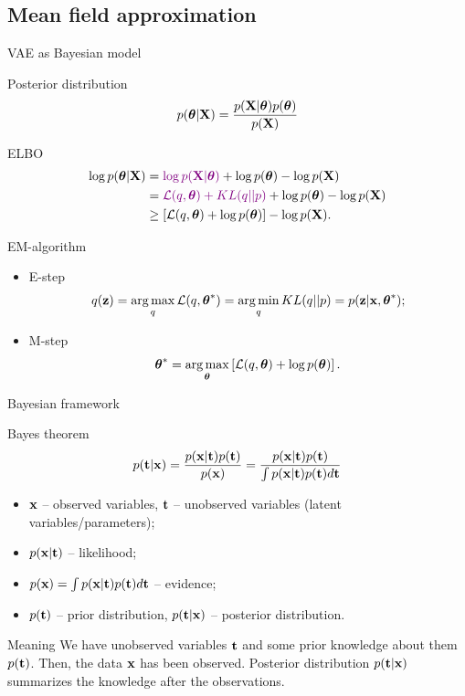 \subsection{Mean field approximation}
\begin{frame}{VAE as Bayesian model}
	\begin{block}{Posterior distribution}
		\vspace{-0.2cm}
		\[
		p(\boldsymbol{\theta} | \mathbf{X}) = \frac{p(\mathbf{X} | \boldsymbol{\theta}) p(\boldsymbol{\theta})}{p(\mathbf{X})}
		\]
		\vspace{-0.5cm}
	\end{block}
	\begin{block}{ELBO}
		\vspace{-0.5cm}
		\begin{align*}
			\log p(\boldsymbol{\theta} | \mathbf{X}) &= {\color{violet}\log p(\mathbf{X} | \boldsymbol{\theta})} + \log p(\boldsymbol{\theta}) - \log p(\mathbf{X}) \\
			&= {\color{violet}\mathcal{L}(q, \boldsymbol{\theta}) + KL(q || p)} + \log p(\boldsymbol{\theta}) - \log p(\mathbf{X}) \\
			&\geq \left[ \mathcal{L}(q, \boldsymbol{\theta}) + \log p(\boldsymbol{\theta}) \right] - \log p(\mathbf{X}) .
		\end{align*}
		\vspace{-0.7cm}
	\end{block}
	\begin{block}{EM-algorithm}
		\begin{itemize}
			\item E-step
			\vspace{-0.2cm}
			\[
			q(\mathbf{z}) = \operatorname*{arg\,max}_q \mathcal{L} (q, \boldsymbol{\theta}^*) = \operatorname*{arg\,min}_q KL(q || p) =
			p(\mathbf{z}| \mathbf{x}, \boldsymbol{\theta}^*);
			\]
			\vspace{-0.5cm}
			\item M-step
			\[
			\boldsymbol{\theta}^* = \operatorname*{arg\,max}_{\boldsymbol{\theta}} \left[ \mathcal{L} (q, \boldsymbol{\theta}) + \log p(\boldsymbol{\theta}) \right].
			\]
		\end{itemize}
	\end{block}
\end{frame}
\begin{frame}{Bayesian framework}
	\begin{block}{Bayes theorem}
		\[
			p(\mathbf{t} | \mathbf{x}) = \frac{p(\mathbf{x} | \mathbf{t}) p(\mathbf{t})}{p(\mathbf{x})} = \frac{p(\mathbf{x} | \mathbf{t}) p(\mathbf{t})}{\int p(\mathbf{x} | \mathbf{t}) p(\mathbf{t}) d \mathbf{t}} 
		\]
		\begin{itemize}
			\item $\mathbf{x}$ -- observed variables, $\mathbf{t}$ -- unobserved variables (latent variables/parameters);
			\item $p(\mathbf{x} | \mathbf{t})$ -- likelihood;
			\item $p(\mathbf{x}) = \int p(\mathbf{x} | \mathbf{t}) p(\mathbf{t}) d \mathbf{t}$ -- evidence;
			\item $p(\mathbf{t})$ -- prior distribution, $p(\mathbf{t} | \mathbf{x})$ -- posterior distribution.
		\end{itemize}
	\end{block}
	\begin{block}{Meaning}
		We have unobserved variables $\mathbf{t}$ and some prior knowledge about them $p(\mathbf{t})$. Then, the data $\mathbf{x}$ has been observed. 
		Posterior distribution $p(\mathbf{t} | \mathbf{x})$ summarizes the knowledge after the observations.
	\end{block}
\end{frame}

